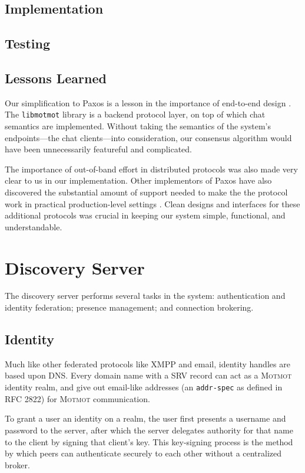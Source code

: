 \documentclass{sig-alternate}
\newcommand\Motmot{\textsc{Motmot}\xspace}
\newcommand\libmotmot{\texttt{libmotmot}\xspace}
\begin{document}
\subsection{Implementation}

\subsection{Testing}

\subsection{Lessons Learned}

Our simplification to Paxos is a lesson in the importance of end-to-end design
\cite{end2end}.  The \libmotmot library is a backend protocol layer, on top of
which chat semantics are implemented.  Without taking the semantics of the
system's endpoints---the chat clients---into consideration, our consensus
algorithm would have been unnecessarily featureful and complicated.

The importance of out-of-band effort in distributed protocols was also made
very clear to us in our implementation.  Other implementors of Paxos have also
discovered the substantial amount of support needed to make the the protocol
work in practical production-level settings \cite{paxlive}.  Clean designs
and interfaces for these additional protocols was crucial in keeping our
system simple, functional, and understandable.

\section{Discovery Server}

The discovery server performs several tasks in the system: authentication and
identity federation; presence management; and connection brokering.

\subsection{Identity}

Much like other federated protocols like XMPP and email, identity handles are
based upon DNS. Every domain name with a SRV record can act as a \Motmot
identity realm, and give out email-like addresses (an \verb`addr-spec` as
defined in RFC 2822) for \Motmot communication.

To grant a user an identity on a realm, the user first presents a username and
password to the server, after which the server delegates authority for that name
to the client by signing that client's key. This key-signing process is the
method by which peers can authenticate securely to each other without a
centralized broker.
\end{document}
